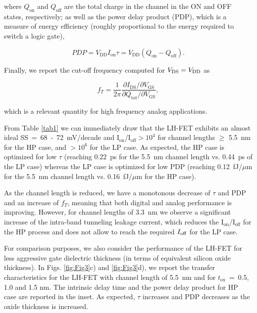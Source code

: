 \documentclass[aps,reprint,superscriptaddress,secnumarabic,amssymb,showpacs]{revtex4-1}
\begin{document}
where $Q_{\text{on}}$ and $Q_{\text{off}}$ are the total charge in the channel in the ON and OFF states, respectively; as well as the power delay product (PDP), which is a measure of energy efficiency (roughly proportional to the energy required to switch a logic gate),

\begin{equation}
PDP = V_{\text{DD}}I_{\text{on}}\tau = V_{\text{DD}}\left(Q_{\text{on}}-Q_{\text{off}} \right).
\end{equation}

Finally, we report the cut-off frequency computed for $V_{\rm DS} = V_{\rm DD}$ as

\begin{equation}
f_{T} = \frac{1}{2\pi} \frac{\partial I_{\text{DS}}/\partial V_{\text{GS}}}{\partial Q_{\text{tot}}/\partial V_{\text{GS}}},
\end{equation}

which is a relevant quantity for high frequency analog applications.

From Table \ref{tab1} we can immediately draw that the LH-FET exhibits an almost ideal SS~=~68~-~72~mV/decade and I$_{\text{on}}$/I$_{\text{off}} > 10^4$ for channel lengths $\geq$ 5.5~nm for the HP case, and $>10^6$ for the LP case. As expected, the HP case is optimized for low $\tau$ (reaching 0.22~ps for the 5.5~nm channel length vs. 0.44~ps of the LP case) whereas the LP case is optimized for low PDP (reaching 0.12~fJ/$\mu$m for the 5.5~nm channel length vs. 0.16~fJ/$\mu$m for the HP case).

As the channel length is reduced, we have a monotonous decrease of $\tau$ and PDP and an increase of $f_T$, meaning that both digital and analog performance is improving. However, for channel lengths of 3.3~nm we observe a significant increase of the intra-band tunneling leakage current, which reduces the I$_{\text{on}}$/I$_{\text{off}}$ for the HP process and does not allow to reach the required $I_{\rm off}$ for the LP case.

For comparison purposes, we also consider the performance of the LH-FET for less aggressive gate dielectric thickness (in terms of equivalent silicon oxide thickness). In Figs. \ref{fig:Fig3}c) and \ref{fig:Fig3}d), we report the transfer characteristics for the LH-FET with channel length of 5.5~nm and for $t_{\text{ox}}$~=~0.5, 1.0 and 1.5 nm. The intrinsic delay time and the power delay product for HP case are reported in the inset. As expected, $\tau$ increases and PDP decreases as the oxide thickness is increased.
\end{document}

